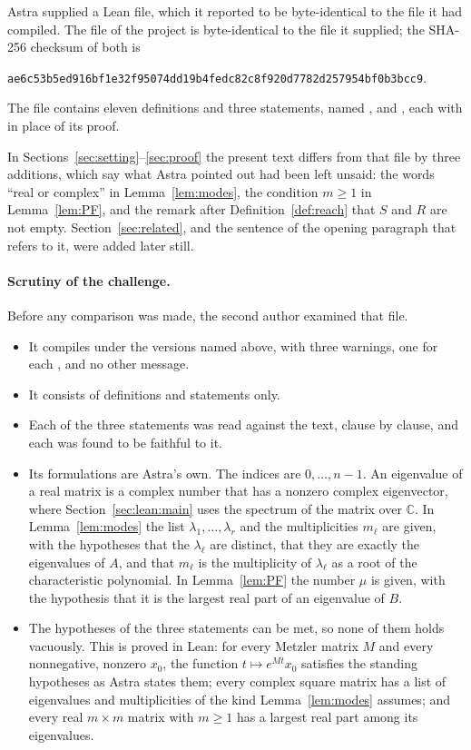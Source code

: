 \documentclass[11pt]{article}
\theoremstyle{definition}
\theoremstyle{remark}
\newcommand{\C}{\mathbb{C}}
\begin{document}
Astra supplied a Lean file, which it reported to be byte-identical to the file it had compiled.
The file  of the project is byte-identical to the file it
supplied; the SHA-256 checksum of both is
\begin{center}
\small\texttt{ae6c53b5ed916bf1e32f95074dd19b4fedc82c8f920d7782d257954bf0b3bcc9}.
\end{center}
The file contains eleven definitions and three statements, named ,
 and , each with  in place of its proof.

In Sections~\ref{sec:setting}--\ref{sec:proof} the present text differs from that file by three
additions, which say what Astra pointed out had been left unsaid: the words ``real or complex''
in Lemma~\ref{lem:modes}, the condition $m \ge 1$ in Lemma~\ref{lem:PF}, and the remark after
Definition~\ref{def:reach} that $S$ and $R$ are not empty. Section~\ref{sec:related}, and the
sentence of the opening paragraph that refers to it, were added later still.

\paragraph{Scrutiny of the challenge.}
Before any comparison was made, the second author examined that file.
\begin{itemize}[leftmargin=2em]
  \item It compiles under the versions named above, with three warnings, one for each
        , and no other message.
  \item It consists of definitions and statements only.
  \item Each of the three statements was read against the text, clause by clause, and each was
        found to be faithful to it.
  \item Its formulations are Astra's own. The indices are $0, \dots, n-1$. An eigenvalue of a
        real matrix is a complex number that has a nonzero complex eigenvector, where
        Section~\ref{sec:lean:main} uses the spectrum of the matrix over $\C$. In
        Lemma~\ref{lem:modes} the list $\lambda_1, \dots, \lambda_r$ and the multiplicities
        $m_\ell$ are given, with the hypotheses that the $\lambda_\ell$ are distinct, that they
        are exactly the eigenvalues of $A$, and that $m_\ell$ is the multiplicity of
        $\lambda_\ell$ as a root of the characteristic polynomial. In Lemma~\ref{lem:PF} the
        number $\mu$ is given, with the hypothesis that it is the largest real part of an
        eigenvalue of $B$.
  \item The hypotheses of the three statements can be met, so none of them holds vacuously.
        This is proved in Lean: for every Metzler matrix $M$ and every nonnegative, nonzero
        $x_0$, the function $t \mapsto e^{Mt} x_0$ satisfies the standing hypotheses as Astra
        states them; every complex square matrix has a list of eigenvalues and multiplicities of
        the kind Lemma~\ref{lem:modes} assumes; and every real $m \times m$ matrix with $m \ge 1$
        has a largest real part among its eigenvalues.
\end{itemize}
\end{document}
